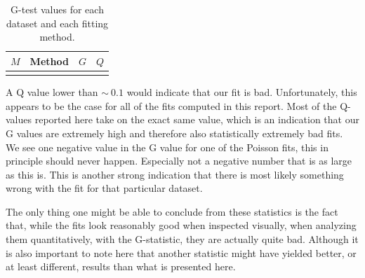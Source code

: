 \begin{table}[h]
    \centering
    \begin{tabular}{|c|c|c|c|}
    \hline
    $M$ & Method & $G$ & $Q$ \\
    \hline
     \\
    \hline
    \end{tabular}
    \caption{G-test values for each dataset and each fitting method.}
    \label{tab:stats}
\end{table}

A Q value lower than $\sim~0.1$ would indicate that our fit is bad. Unfortunately, this appears to be the case for all of the fits computed in this report. Most of the Q-values reported here take on the exact same value, which is an indication that our G values are extremely high and therefore also statistically extremely bad fits. We see one negative value in the G value for one of the Poisson fits, this in principle should never happen. Especially not a negative number that is as large as this is. This is another strong indication that there is most likely something wrong with the fit for that particular dataset. 

The only thing one might be able to conclude from these statistics is the fact that, while the fits look reasonably good when inspected visually, when analyzing them quantitatively, with the G-statistic, they are actually quite bad. Although it is also important to note here that another statistic might have yielded better, or at least different, results than what is presented here.


\newpage


